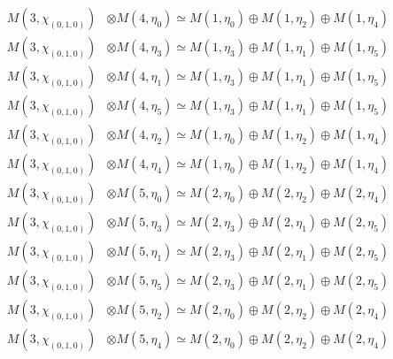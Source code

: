 \begin{align*}
M(3,\chi_{(0,1,0)}) &\otimes M(4,\eta_{0}) \simeq M(1,\eta_{0}) \oplus M(1,\eta_{2}) \oplus M(1,\eta_{4})\\
M(3,\chi_{(0,1,0)}) &\otimes M(4,\eta_{3}) \simeq M(1,\eta_{3}) \oplus M(1,\eta_{1}) \oplus M(1,\eta_{5})\\
M(3,\chi_{(0,1,0)}) &\otimes M(4,\eta_{1}) \simeq M(1,\eta_{3}) \oplus M(1,\eta_{1}) \oplus M(1,\eta_{5})\\
M(3,\chi_{(0,1,0)}) &\otimes M(4,\eta_{5}) \simeq M(1,\eta_{3}) \oplus M(1,\eta_{1}) \oplus M(1,\eta_{5})\\
M(3,\chi_{(0,1,0)}) &\otimes M(4,\eta_{2}) \simeq M(1,\eta_{0}) \oplus M(1,\eta_{2}) \oplus M(1,\eta_{4})\\
M(3,\chi_{(0,1,0)}) &\otimes M(4,\eta_{4}) \simeq M(1,\eta_{0}) \oplus M(1,\eta_{2}) \oplus M(1,\eta_{4})\\
M(3,\chi_{(0,1,0)}) &\otimes M(5,\eta_{0}) \simeq M(2,\eta_{0}) \oplus M(2,\eta_{2}) \oplus M(2,\eta_{4})\\
M(3,\chi_{(0,1,0)}) &\otimes M(5,\eta_{3}) \simeq M(2,\eta_{3}) \oplus M(2,\eta_{1}) \oplus M(2,\eta_{5})\\
M(3,\chi_{(0,1,0)}) &\otimes M(5,\eta_{1}) \simeq M(2,\eta_{3}) \oplus M(2,\eta_{1}) \oplus M(2,\eta_{5})\\
M(3,\chi_{(0,1,0)}) &\otimes M(5,\eta_{5}) \simeq M(2,\eta_{3}) \oplus M(2,\eta_{1}) \oplus M(2,\eta_{5})\\
M(3,\chi_{(0,1,0)}) &\otimes M(5,\eta_{2}) \simeq M(2,\eta_{0}) \oplus M(2,\eta_{2}) \oplus M(2,\eta_{4})\\
M(3,\chi_{(0,1,0)}) &\otimes M(5,\eta_{4}) \simeq M(2,\eta_{0}) \oplus M(2,\eta_{2}) \oplus M(2,\eta_{4})\\
\end{align*}


